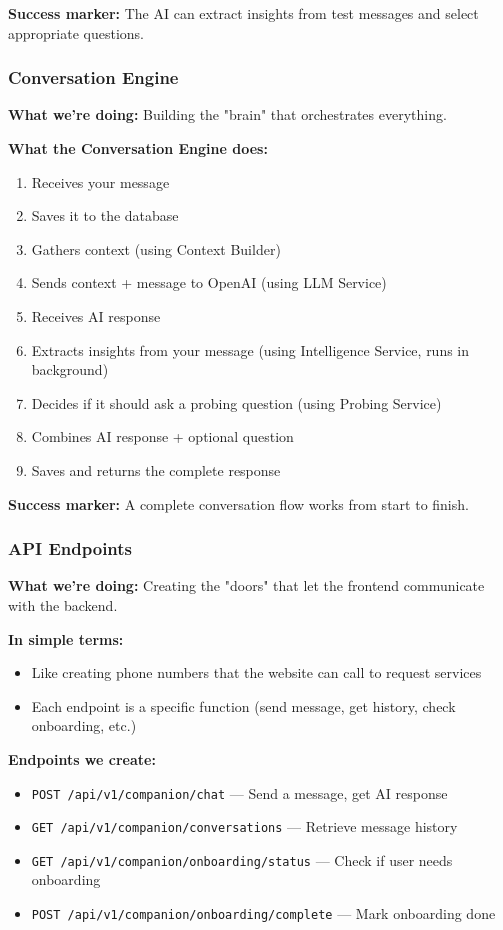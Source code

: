 \documentclass[12pt,a4paper]{article}
\begin{document}
\textbf{Success marker:} The AI can extract insights from test messages and select appropriate questions.

\subsubsection{Conversation Engine }

\textbf{What we're doing:} Building the "brain" that orchestrates everything.

\textbf{What the Conversation Engine does:}
\begin{enumerate}
  \item Receives your message
  \item Saves it to the database
  \item Gathers context (using Context Builder)
  \item Sends context + message to OpenAI (using LLM Service)
  \item Receives AI response
  \item Extracts insights from your message (using Intelligence Service, runs in background)
  \item Decides if it should ask a probing question (using Probing Service)
  \item Combines AI response + optional question
  \item Saves and returns the complete response
\end{enumerate}

\textbf{Success marker:} A complete conversation flow works from start to finish.

\subsubsection{API Endpoints }

\textbf{What we're doing:} Creating the "doors" that let the frontend communicate with the backend.

\textbf{In simple terms:}
\begin{itemize}
  \item Like creating phone numbers that the website can call to request services
  \item Each endpoint is a specific function (send message, get history, check onboarding, etc.)
\end{itemize}

\textbf{Endpoints we create:}
\begin{itemize}
  \item \texttt{POST /api/v1/companion/chat} — Send a message, get AI response
  \item \texttt{GET /api/v1/companion/conversations} — Retrieve message history
  \item \texttt{GET /api/v1/companion/onboarding/status} — Check if user needs onboarding
  \item \texttt{POST /api/v1/companion/onboarding/complete} — Mark onboarding done
\end{itemize}
\end{document}
